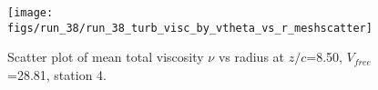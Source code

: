 \begin{figure}[H]
\centering
\texttt{[image: figs/run\_38/run\_38\_turb\_visc\_by\_vtheta\_vs\_r\_meshscatter]}
\caption{Scatter plot of mean total viscosity $\nu$ vs radius at $z/c$=8.50, $V_{free}$=28.81, station 4.}
\label{fig:run_38_turb_visc_by_vtheta_vs_r_meshscatter}
\end{figure}


